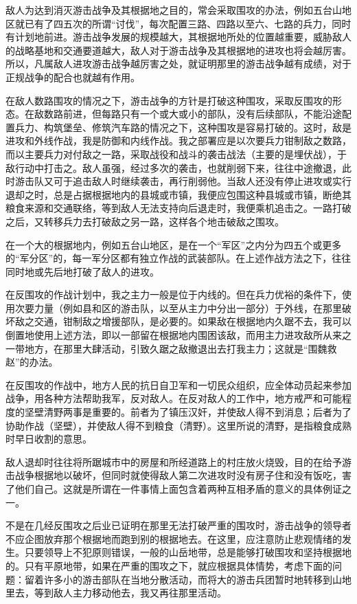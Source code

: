 敌人为达到消灭游击战争及其根据地之目的，常会采取围攻的办法，例如五台山地区就已有了四五次的所谓“讨伐”，每次配置三路、四路以至六、七路的兵力，同时有计划地前进。游击战争发展的规模越大，其根据地所处的位置越重要，威胁敌人的战略基地和交通要道越大，敌人对于游击战争及其根据地的进攻也将会越厉害。所以，凡属敌人进攻游击战争越厉害之处，就证明那里的游击战争越有成绩，对于正规战争的配合也就越有作用。

在敌人数路围攻的情况之下，游击战争的方针是打破这种围攻，采取反围攻的形态。在敌数路前进，但每路只有一个或大或小的部队，没有后续部队，不能沿途配置兵力、构筑堡垒、修筑汽车路的情况之下，这种围攻是容易打破的。这时，敌是进攻和外线作战，我是防御和内线作战。我之部署应是以次要兵力钳制敌之数路，而以主要兵力对付敌之一路，采取战役和战斗的袭击战法（主要的是埋伏战），于敌行动中打击之。敌人虽强，经过多次的袭击，也就削弱下来，往往中途撤退，此时游击队又可于追击敌人时继续袭击，再行削弱他。当敌人还没有停止进攻或实行退却之时，总是占据根据地内的县城或市镇，我便应包围这种县城或市镇，断绝其粮食来源和交通联络，等到敌人无法支持向后退走时，我便乘机追击之。一路打破之后，又转移兵力去打破敌之另一路，这样各个地击破敌之围攻。

在一个大的根据地内，例如五台山地区，是在一个“军区”之内分为四五个或更多的“军分区”的，每一军分区都有独立作战的武装部队。在上述作战方法之下，往往同时地或先后地打破了敌人的进攻。

在反围攻的作战计划中，我之主力一般是位于内线的。但在兵力优裕的条件下，使用次要力量（例如县和区的游击队，以至从主力中分出一部分）于外线，在那里破坏敌之交通，钳制敌之增援部队，是必要的。如果敌在根据地内久踞不去，我可以倒置地使用上述方法，即以一部留在根据地内围困该敌，而用主力进攻敌所从来之一带地方，在那里大肆活动，引致久踞之敌撤退出去打我主力；这就是“围魏救赵”的办法。

在反围攻的作战中，地方人民的抗日自卫军和一切民众组织，应全体动员起来参加战争，用各种方法帮助我军，反对敌人。在反对敌人的工作中，地方戒严和可能程度的坚壁清野两事是重要的。前者为了镇压汉奸，并使敌人得不到消息；后者为了协助作战（坚壁），并使敌人得不到粮食（清野）。这里所说的清野，是指粮食成熟时早日收割的意思。

敌人退却时往往将所踞城市中的房屋和所经道路上的村庄放火烧毁，目的在给予游击战争根据地以破坏，但同时就使得敌人第二次进攻时没有房子住和没有饭吃，害了他们自己。这就是所谓在一件事情上面包含着两种互相矛盾的意义的具体例证之一。

不是在几经反围攻之后业已证明在那里无法打破严重的围攻时，游击战争的领导者不应企图放弃那个根据地而跑到别的根据地去。在这里，应注意防止悲观情绪的发生。只要领导上不犯原则错误，一般的山岳地带，总是能够打破围攻和坚持根据地的。只有平原地带，如果在严重的围攻之下，就应根据具体情势，考虑下面的问题：留着许多小的游击部队在当地分散活动，而将大的游击兵团暂时地转移到山地里去，等到敌人主力移动他去，我又再往那里活动。

